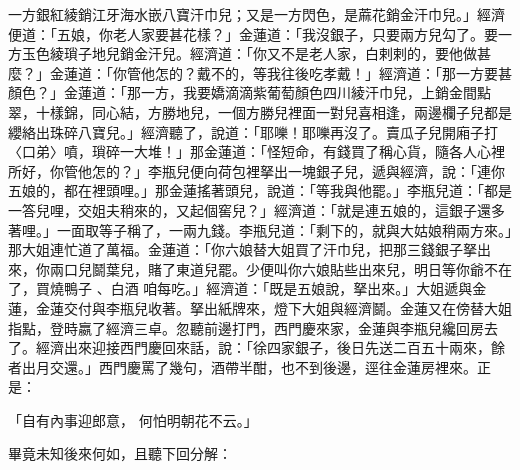 \begin{showcontents}{}
一方銀紅綾銷江牙海水嵌八寶汗巾兒；又是一方閃色，是蔴花銷金汗巾兒。」經濟便道：「五娘，你老人家要甚花樣？」金蓮道：「我沒銀子，只要兩方兒勾了。要一方玉色綾瑣子地兒銷金汗兒。經濟道：「你又不是老人家，白剌剌的，要他做甚麼？」金蓮道：「你管他怎的？戴不的，等我往後吃孝戴！」經濟道：「那一方要甚顏色？」金蓮道：「那一方，我要嬌滴滴紫葡萄顏色四川綾汗巾兒，上銷金間點翠，十樣錦，同心結，方勝地兒，一個方勝兒裡面一對兒喜相逢，兩邊欄子兒都是纓絡出珠碎八寶兒。」經濟聽了，說道：「耶嚛！耶嚛再沒了。賣瓜子兒開廂子打〈口弟〉噴，瑣碎一大堆！」那金蓮道：「怪短命，有錢買了稱心貨，隨各人心裡所好，你管他怎的？」李瓶兒便向荷包裡拏出一塊銀子兒，遞與經濟，說：「連你五娘的，都在裡頭哩。」那金蓮搖著頭兒，說道：「等我與他罷。」李瓶兒道：「都是一答兒哩，交姐夫稍來的，又起個窖兒？」經濟道：「就是連五娘的，這銀子還多著哩。」一面取等子稱了，一兩九錢。李瓶兒道：「剩下的，就與大姑娘稍兩方來。」那大姐連忙道了萬福。金蓮道：「你六娘替大姐買了汗巾兒，把那三錢銀子拏出來，你兩口兒鬬葉兒，賭了東道兒罷。少便叫你六娘貼些出來兒，明日等你爺不在了，買燒鴨子 、白酒 咱每吃。」經濟道：「既是五娘說，拏出來。」大姐遞與金蓮，金蓮交付與李瓶兒收著。拏出紙牌來，燈下大姐與經濟鬬。金蓮又在傍替大姐指點，登時嬴了經濟三卓。忽聽前邊打門，西門慶來家，金蓮與李瓶兒纔回房去了。經濟出來迎接西門慶回來話，說：「徐四家銀子，後日先送二百五十兩來，餘者出月交還。」西門慶罵了幾句，酒帶半酣，也不到後邊，逕往金蓮房裡來。正是：

「自有內事迎郎意，  何怕明朝花不云。」

畢竟未知後來何如，且聽下回分解：




\end{showcontents}


